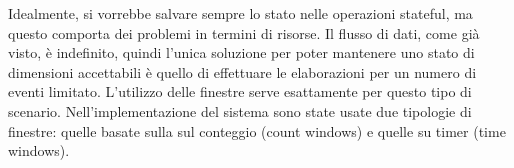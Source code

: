 Idealmente, si vorrebbe salvare sempre lo stato nelle operazioni stateful, ma questo comporta dei problemi in termini di risorse. Il flusso di dati, come già visto, è indefinito, quindi l'unica soluzione per poter mantenere uno stato di dimensioni accettabili è quello di effettuare le elaborazioni per un numero di eventi limitato. L'utilizzo delle finestre serve esattamente per questo tipo di scenario. Nell'implementazione del sistema sono state usate due tipologie di finestre: quelle basate sulla sul conteggio (count windows) e quelle su timer (time windows). %


 


     



